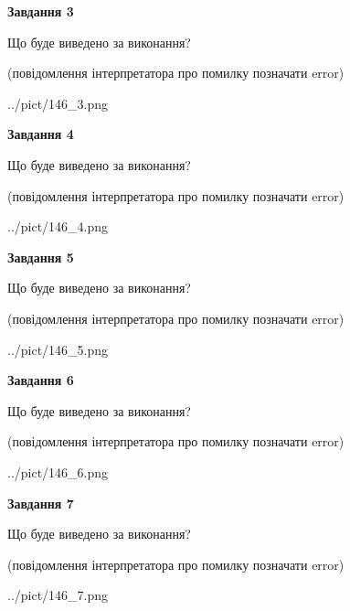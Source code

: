 \documentclass[12pt, ukrainian]{article}
\begin{document}
{\begin {large}
{\begin {center}\textbf{Завдання 3}\end {center}}\par
Що буде виведено за виконання?\par
 (повідомлення інтерпретатора про помилку позначати error)\par
\begin{center}
	{../pict/146_3.png}
\end{center}
\newpage

{\begin {center}\textbf{Завдання 4}\end {center}}\par
Що буде виведено за виконання?\par
 (повідомлення інтерпретатора про помилку позначати error)\par
\begin{center}
	{../pict/146_4.png}
\end{center}
\newpage

{\begin {center}\textbf{Завдання 5}\end {center}}\par
Що буде виведено за виконання?\par
 (повідомлення інтерпретатора про помилку позначати error)\par
\begin{center}
	{../pict/146_5.png}
\end{center}
\newpage

{\begin {center}\textbf{Завдання 6}\end {center}}\par
Що буде виведено за виконання?\par
 (повідомлення інтерпретатора про помилку позначати error)\par
\begin{center}
	{../pict/146_6.png}
\end{center}
\newpage

{\begin {center}\textbf{Завдання 7}\end {center}}\par
Що буде виведено за виконання?\par
 (повідомлення інтерпретатора про помилку позначати error)\par
\begin{center}
	{../pict/146_7.png}
\end{center}
\newpage


\end{large}}
\end{document}
